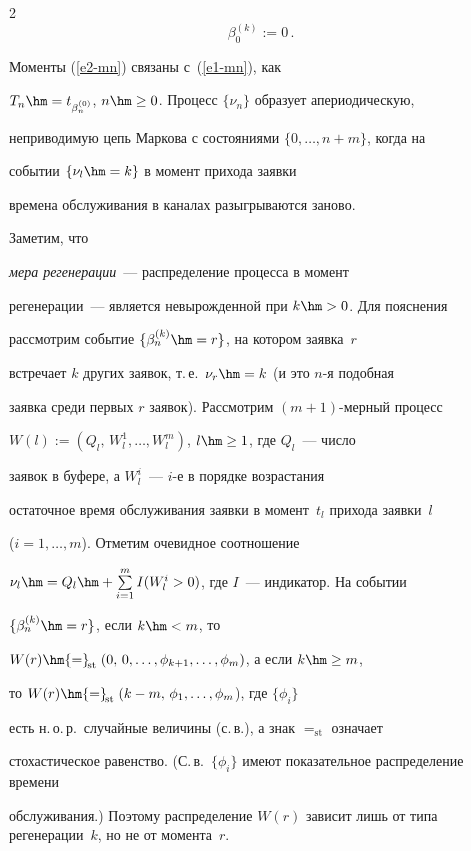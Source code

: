 \begin{multicols}{2}
\begin{equation}
\beta^{(k)}_0:=0\,.


\label{e2-mn}


\end{equation}


Моменты  (\ref{e2-mn}) связаны с~(\ref{e1-mn}), как


$T_n\hm=t_{\beta^{(0)}_n}$, $n\hm\ge0$. Процесс $\{\nu_n\}$ образует апериодическую,


неприводимую цепь Маркова с  состояниями $\{0,\ldots,n+m\}$, когда на 


событии $\{\nu_l\hm=k \}$ в момент прихода   заявки


времена обслуживания  в каналах  разыгрываются заново. 





Заметим, что


{\it мера регенерации}~--- распределение процесса в момент


регенерации~--- является невырожденной при  $k\hm>0$. Для пояснения


рассмотрим событие $\{\beta^{(k)}_{n}\hm=r\}$, на котором заявка~$r$


встречает $k$ других заявок, т.\,е.\ $\nu_r\hm=k$ (и это $n$-я подобная


заявка среди первых $r$ заявок). Рассмотрим $(m+1)$-мер\-ный процесс


$W(l):=(Q_l,\, W_l^1, \ldots, W_l^m)$, $l\hm\ge1$, где $Q_l$~--- число


заявок  в буфере, а $W_l^i$~--- $i$-е в порядке возрастания


остаточное время обслуживания заявки  в момент~$t_l$ прихода заявки~$l$


($i=1,\dots,m$). Отметим очевидное соотношение


$\nu_l\hm=Q_l\hm+\sum\limits_{i=1}^mI(W_l^i>0)$, где $I$~--- индикатор. На событии


$\{\beta^{(k)}_{n}\hm=r\}$, если $k\hm< m$, то


$W(r)\hm{=}_{\!\mathrm{st}}\;(0,\,0,\ldots,\phi_{k+1}, \ldots, \phi_m)$, а если $k\hm\ge m$, 


то $W(r)\hm{=}_{\!\mathrm{st}}\;(k-m,\,\phi_1, \ldots, \phi_m$), где $\{\phi_i\}$


есть н.\,о.\,р.\   случайные величины (с.\,в.), а знак ${=}_{\mathrm{st}}$ означает 


стохастическое равенство. (С.\,в.~$\{\phi_i\}$  имеют показательное распределение    времени


обслуживания.) Поэтому распределение $W(r)$ зависит лишь от типа регенерации~$k$, но не от момента~$r$.






\end{multicols}
